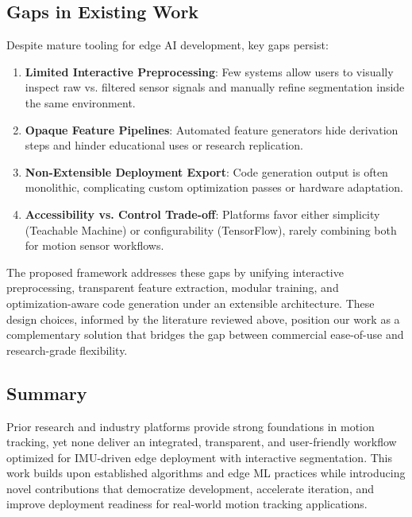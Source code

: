 \subsection{Gaps in Existing Work}
Despite mature tooling for edge AI development, key gaps persist:
\begin{enumerate}
    \item \textbf{Limited Interactive Preprocessing}: Few systems allow users to visually inspect raw vs. filtered sensor signals and manually refine segmentation inside the same environment.
    \item \textbf{Opaque Feature Pipelines}: Automated feature generators hide derivation steps and hinder educational uses or research replication.
    \item \textbf{Non-Extensible Deployment Export}: Code generation output is often monolithic, complicating custom optimization passes or hardware adaptation.
    \item \textbf{Accessibility vs. Control Trade-off}: Platforms favor either simplicity (Teachable Machine) or configurability (TensorFlow), rarely combining both for motion sensor workflows.
\end{enumerate}
The proposed framework addresses these gaps by unifying interactive preprocessing, transparent feature extraction, modular training, and optimization-aware code generation under an extensible architecture. These design choices, informed by the literature reviewed above, position our work as a complementary solution that bridges the gap between commercial ease-of-use and research-grade flexibility.

\subsection{Summary}
Prior research and industry platforms provide strong foundations in motion tracking, yet none deliver an integrated, transparent, and user-friendly workflow optimized for IMU-driven edge deployment with interactive segmentation. This work builds upon established algorithms and edge ML practices while introducing novel contributions that democratize development, accelerate iteration, and improve deployment readiness for real-world motion tracking applications.
